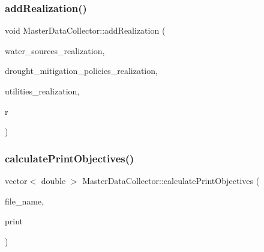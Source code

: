 \subsubsection{\texorpdfstring{add\+Realization()}{addRealization()}}
{\footnotesize\ttfamily void Master\+Data\+Collector\+::add\+Realization (\begin{DoxyParamCaption}\item[{vector$<$ \mbox{\hyperlink{classWaterSource}{Water\+Source}} $\ast$$>$}]{water\+\_\+sources\+\_\+realization,  }\item[{vector$<$ \mbox{\hyperlink{classDroughtMitigationPolicy}{Drought\+Mitigation\+Policy}} $\ast$$>$}]{drought\+\_\+mitigation\+\_\+policies\+\_\+realization,  }\item[{vector$<$ \mbox{\hyperlink{classUtility}{Utility}} $\ast$$>$}]{utilities\+\_\+realization,  }\item[{unsigned long}]{r }\end{DoxyParamCaption})}

\mbox{\label{classMasterDataCollector_a30c5c81c8c2ccb475ce2ccbb2ae07608_a30c5c81c8c2ccb475ce2ccbb2ae07608}} 
\subsubsection{\texorpdfstring{calculate\+Print\+Objectives()}{calculatePrintObjectives()}}
{\footnotesize\ttfamily vector$<$ double $>$ Master\+Data\+Collector\+::calculate\+Print\+Objectives (\begin{DoxyParamCaption}\item[{string}]{file\+\_\+name,  }\item[{bool}]{print }\end{DoxyParamCaption})}

\mbox{\label{classMasterDataCollector_a92683f7c5ec82e45259fe403be285149_a92683f7c5ec82e45259fe403be285149}} 
